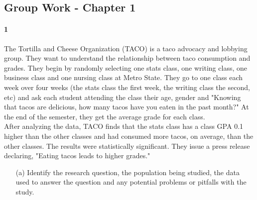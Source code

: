 \documentclass{article}
\begin{document}
\begin{flushleft}
\section*{Group Work - Chapter 1}
\paragraph{1} The Tortilla and Cheese Organization (TACO) is a taco advocacy and lobbying group. They want to understand the relationship between taco consumption and grades. They begin by randomly selecting one stats class, one writing class, one business class and one nursing class at Metro State. They go to one class each week over four weeks (the stats class the first week, the writing class the second, etc) and ask each student attending the class their age, gender and "Knowing that tacos are delicious, how many tacos have you eaten in the past month?" At the end of the semester, they get the average grade for each class.\\
\medskip
After analyzing the data, TACO finds that the stats class has a class GPA 0.1 higher than the other classes and had consumed more tacos, on average, than the other classes. The results were statistically significant. They issue a press release declaring, "Eating tacos leads to higher grades."

\begin{itemize}
\item [(a)] Identify the research question, the population being studied, the data used to answer the question and any potential problems or pitfalls with the study.\\
\medskip
{}\\
\medskip{}\\
\medskip{}\\
\medskip{}
\vspace{.5in}


\end{itemize}
\end{flushleft}
\end{document}
